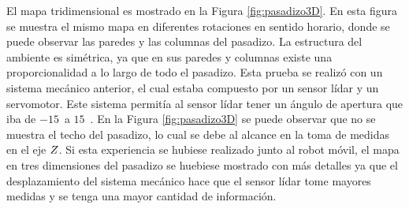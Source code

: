 
El mapa tridimensional es mostrado en la Figura \ref{fig:pasadizo3D}. En esta 
figura se muestra el mismo mapa en diferentes rotaciones en sentido horario, 
donde se puede observar las paredes y las columnas del pasadizo. La estructura 
del ambiente es simétrica, ya que en sus paredes y columnas existe una 
proporcionalidad a lo largo de todo el pasadizo. Esta prueba se realizó con 
un sistema mecánico anterior, el cual estaba compuesto por un sensor lídar 
y un servomotor. Este sistema permitía al sensor lídar tener un ángulo de apertura 
que iba de $-15$~\grad a $15$~\grad. En la Figura \ref{fig:pasadizo3D} se
puede observar que no se muestra el techo del pasadizo, lo cual se debe al alcance en 
la toma de medidas en el eje $\mathnormal Z$. Si esta experiencia se hubiese realizado 
junto al robot móvil, el mapa en tres dimensiones del pasadizo se huebiese mostrado
con más detalles ya que el desplazamiento del sistema mecánico hace que el sensor
lídar tome mayores medidas y se tenga una mayor cantidad de información.


